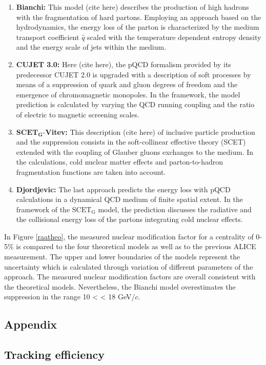\documentclass[12pt,a4paper]{report}
\begin{document}
\begin{enumerate}
\item \textbf{Bianchi:} This model (cite here) describes the production of high \pt hadrons with the fragmentation of hard partons. Employing an approach based on the hydrodynamics, the energy loss of the parton is characterized by the medium transport coefficient $\hat q$ scaled with the temperature dependent entropy density and the energy scale of jets within the medium.
\item \textbf{CUJET 3.0:} Here (cite here), the pQCD formalism provided by its predecessor CUJET 2.0 is upgraded with a description of soft processes by means of a suppression of quark and gluon degrees of freedom and the emergence of chromomagnetic monopoles. In the framework, the model prediction is calculated by varying the QCD running coupling and the ratio of electric to magnetic screening scales.
\item $\mathbf{SCET}_\mathbf{G}$-\textbf{Vitev:} This description (cite here) of inclusive particle production and the suppression consists in the soft-collinear effective theory (SCET) extended with the coupling of Glauber gluons exchanges to the medium. In the calculations, cold nuclear matter effects and parton-to-hadron fragmentation functions are taken into account.
\item \textbf{Djordjevic:} The last approach predicts the energy loss with pQCD calculations in a dynamical QCD medium of finite spatial extent. In the framework of the $\text{SCET}_\text{G}$ model, the prediction discusses the radiative and the collisional energy loss of the partons integrating cold nuclear effects.
\end{enumerate}
In Figure \ref{raatheo}, the measured nuclear modification factor for a centrality of 0-5\% is compared to the four theoretical models as well as to the previous ALICE measurement. The upper and lower boundaries of the models represent the uncertainty which is calculated through variation of different parameters of the approach. The measured nuclear modification factors are overall consistent with the theoretical models. Nevertheless, the Bianchi model overestimates the suppression in the \pt range 10 < \pt < 18 GeV/$c$.

\begin{appendices}
\chapter{Appendix}
\section{Tracking efficiency}
\label{TrkEffApp}
\end{appendices}
\end{document}
